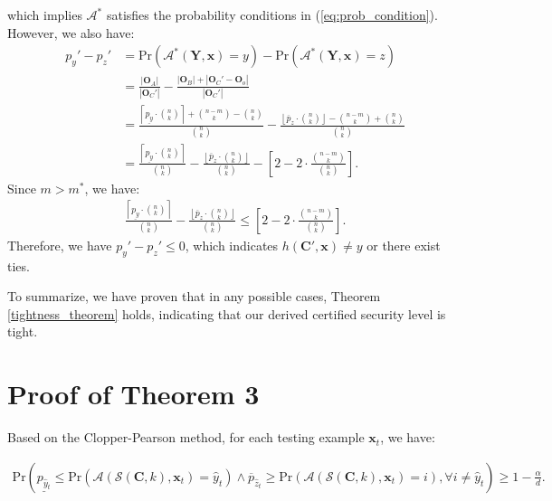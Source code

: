 \documentclass[letterpaper]{article} %
\begin{document}
\begin{enumerate}[label={\bfseries Case \arabic*:}, wide=0pt]
	which implies $\mathcal{A}^*$ satisfies the probability conditions in (\ref{eq:prob_condition}). However, we  also have:
	\begin{align}
		p_y' - p_z' &= \text{Pr}(\mathcal{A}^*(\mathbf{Y},\mathbf{x})=y) -  \text{Pr}(\mathcal{A}^*(\mathbf{Y},\mathbf{x})=z)\\
					& = \frac{|\mathbf{O}_A|}{|\mathbf{O}_C'|} - \frac{|\mathbf{O}_B|+|\mathbf{O}_C'-\mathbf{O}_o|}{|\mathbf{O}_C'|}\\
					&= \frac{\left\lceil\underline{p_y} \cdot {n \choose k}\right\rceil + {n-m \choose k} - {n \choose k}}{{n \choose k}} - \frac{\left\lfloor\overline{p}_z \cdot {n \choose k}\right\rfloor - {n-m \choose k} + {n \choose k}}{{n \choose k}}\\
					&= \frac{\left\lceil\underline{p_y} \cdot {n \choose k}\right\rceil}{{n \choose k}} - \frac{\left\lfloor\overline{p}_z \cdot {n \choose k}\right\rfloor}{{n\choose k}} - \left[2 - 2\cdot \frac{{n-m \choose k}}{{n \choose k}}\right].
	\end{align}
	 Since $m>m^*$, we have:
	\begin{align}
	\frac{\left\lceil\underline{p_y} \cdot {n \choose k}\right\rceil}{{n \choose k}} - \frac{\left\lfloor\overline{p}_z \cdot {n \choose k}\right\rfloor}{{n\choose k}}  \le \left[2 - 2\cdot \frac{{n-m \choose k}}{{n \choose k}}\right].
	\end{align}
	Therefore, we have $p_y' - p_z' \le 0$,
	which indicates $h(\mathbf{C'}, \mathbf{x}) \neq y$ or there exist ties.


\end{enumerate}
To summarize, we have proven that in any possible cases, Theorem \ref{tightness_theorem} holds, indicating that our derived certified security level is tight.


\section{Proof of Theorem 3}
\label{proof_of_probability}

Based on the Clopper-Pearson method, for each testing example $\mathbf{x}_t$, we have:  

\begin{align}
    \text{Pr}(\underline{p_{\hat{y}_t}} \leq \text{Pr}(\mathcal{A}(\mathcal{S}(\mathbf{C},k), \mathbf{x}_t)=\hat{y}_t) \land \overline{p}_{\hat{z}_t}\geq \text{Pr}(\mathcal{A}(\mathcal{S}(\mathbf{C},k), \mathbf{x}_t)=i), \forall i \neq \hat{y}_t) \geq 1 - \frac{\alpha}{d}.
\end{align}
\end{document}
